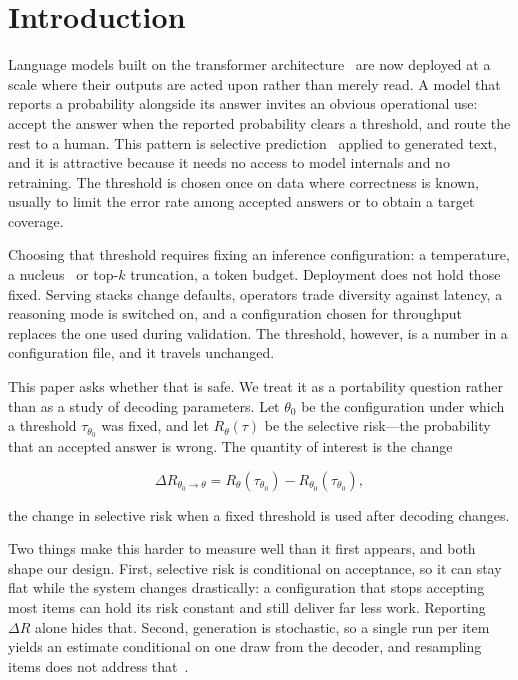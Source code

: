 \documentclass[information,article,submit,moreauthors]{Definitions/mdpi}
\begin{document}
\section{Introduction}

Language models built on the transformer architecture~\cite{vaswani2017} are
now deployed at a scale where their outputs are acted upon rather than merely
read. A model that reports a probability alongside its answer invites an
obvious operational use: accept the answer when the reported probability clears
a threshold, and route the rest to a human. This pattern is selective
prediction~\cite{chow1970,elyaniv2010foundations,geifman2017selective} applied
to generated text, and it is attractive because it needs no access to model
internals and no retraining. The threshold is chosen once on data where
correctness is known, usually to limit the error rate among accepted answers or
to obtain a target coverage.

Choosing that threshold requires fixing an inference configuration: a
temperature, a nucleus~\cite{holtzman2020nucleus} or top-$k$ truncation, a token
budget. Deployment does not hold those fixed. Serving stacks change defaults,
operators trade diversity against latency, a reasoning mode is switched on, and
a configuration chosen for throughput replaces the one used during validation.
The threshold, however, is a number in a configuration file, and it travels
unchanged.

This paper asks whether that is safe. We treat it as a portability question
rather than as a study of decoding parameters. Let $\theta_0$ be the
configuration under which a threshold $\tau_{\theta_0}$ was fixed, and let
$R_\theta(\tau)$ be the selective risk---the probability that an accepted answer
is wrong. The quantity of interest is the change

\begin{equation}
\Delta R_{\theta_0 \rightarrow \theta}
= R_\theta(\tau_{\theta_0}) - R_{\theta_0}(\tau_{\theta_0}),
\label{eq:estimand}
\end{equation}

\noindent
the change in selective risk when a fixed threshold is used after decoding
changes.

Two things make this harder to measure well than it first appears, and both
shape our design. First, selective risk is conditional on acceptance, so it can
stay flat while the system changes drastically: a configuration that stops
accepting most items can hold its risk constant and still deliver far less
work. Reporting $\Delta R$ alone hides that. Second, generation is stochastic,
so a single run per item yields an estimate conditional on one draw from the
decoder, and resampling items does not address that~\cite{song2025greedy}.
\end{document}

